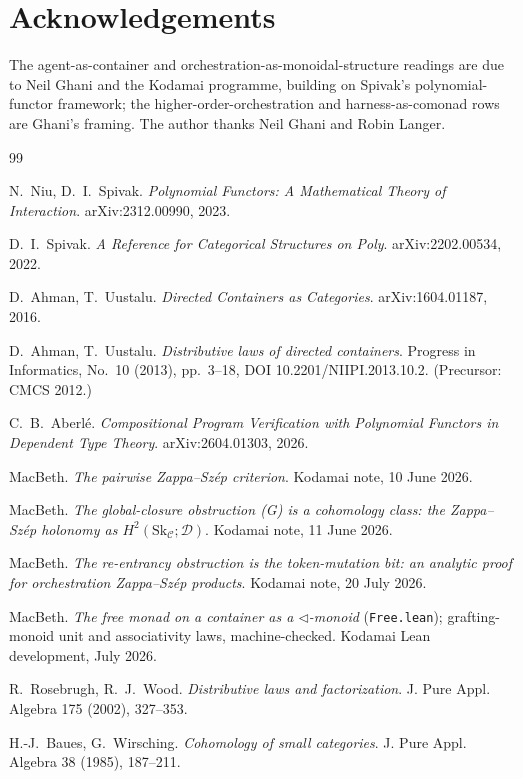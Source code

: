 \documentclass[11pt]{amsart}
\theoremstyle{definition}
\theoremstyle{remark}
\newcommand{\C}{\mathcal{C}}
\newcommand{\Sk}{\mathrm{Sk}}
\newcommand{\seq}{\triangleleft}
\newcommand{\dir}{\mathcal{D}}
\begin{document}
\section*{Acknowledgements}
The agent-as-container and orchestration-as-monoidal-structure readings are due to Neil Ghani
and the Kodamai programme, building on Spivak's polynomial-functor framework; the
higher-order-orchestration and harness-as-comonad rows are Ghani's framing. The author thanks
Neil Ghani and Robin Langer.

\begin{thebibliography}{99}

 N.~Niu, D.~I.~Spivak. \emph{Polynomial Functors: A Mathematical Theory of
Interaction}. arXiv:2312.00990, 2023.

 D.~I.~Spivak. \emph{A Reference for Categorical Structures on
\textup{Poly}}. arXiv:2202.00534, 2022.

 D.~Ahman, T.~Uustalu. \emph{Directed Containers as Categories}.
arXiv:1604.01187, 2016.

 D.~Ahman, T.~Uustalu. \emph{Distributive laws of directed
containers}. Progress in Informatics, No.~10 (2013), pp.~3--18, DOI
10.2201/NIIPI.2013.10.2. (Precursor: CMCS 2012.)

 C.~B.~Aberl\'e. \emph{Compositional Program Verification with Polynomial
Functors in Dependent Type Theory}. arXiv:2604.01303, 2026.

 MacBeth. \emph{The pairwise Zappa--Sz\'ep criterion}. Kodamai note, 10
June 2026.

 MacBeth. \emph{The global-closure obstruction \textnormal{(G)} is a
cohomology class: the Zappa--Sz\'ep holonomy as $H^2(\Sk_\C;\dir)$}. Kodamai note, 11 June
2026.

 MacBeth. \emph{The re-entrancy obstruction is the token-mutation bit: an
analytic proof for orchestration Zappa--Sz\'ep products}. Kodamai note, 20 July 2026.

 MacBeth. \emph{The free monad on a container as a $\seq$-monoid}
(\texttt{Free.lean}); grafting-monoid unit and associativity laws, machine-checked. Kodamai
Lean development, July 2026.

 R.~Rosebrugh, R.~J.~Wood. \emph{Distributive laws and factorization}. J. Pure
Appl. Algebra 175 (2002), 327--353.

 H.-J.~Baues, G.~Wirsching. \emph{Cohomology of small categories}. J.
Pure Appl. Algebra 38 (1985), 187--211.


\end{thebibliography}
\end{document}
